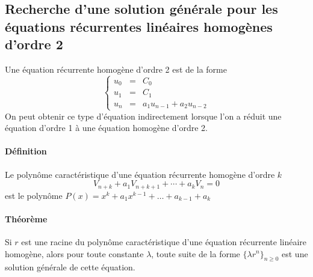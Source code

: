 	\subsection{Recherche d'une solution générale pour les équations récurrentes linéaires homogènes d'ordre 2}
	Une équation récurrente homogène d'ordre 2 est de la forme 
	\begin{displaymath}
		\left\{ \begin{array}{lll}
			u_0 &=&  C_0\\
			u_1 &=&  C_1\\
			u_n &=& a_1 u_{n-1} + a_2 u_{n-2}
		\end{array} \right.
	\end{displaymath}
	On peut obtenir ce type d'équation indirectement lorsque l'on a réduit une équation d'ordre 1 à une équation homogène d'ordre 2.
	\paragraph{Définition}
	Le polynôme caractéristique d'une équation récurrente homogène d'ordre $k$
	$$V_{n+k} + a_1 V_{n+k+1} + \cdots + a_kV_n = 0$$ est le polynôme $P(x) = x^k + a_1x^{k-1}+\ldots+a_{k-1}+a_k$

	\paragraph{Théorème} Si $r$ est une racine du polynôme caractéristique d'une équation récurrente linéaire homogène, alors pour toute constante
	$\lambda$, toute suite de la forme $\{\lambda r^n\}_{n \geq 0}$ est une solution générale de cette équation.

